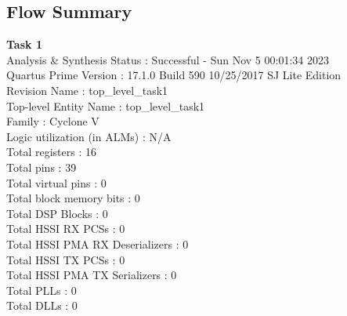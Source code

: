 \documentclass[11pt, titlepage]{article}
\begin{document}
        \subsection{Flow Summary}
            \begin{description}
                \item \textbf{Task 1} \\
                    Analysis \& Synthesis Status : Successful - Sun Nov  5 00:01:34 2023 \\
                    Quartus Prime Version : 17.1.0 Build 590 10/25/2017 SJ Lite Edition \\
                    Revision Name : top\_level\_task1 \\
                    Top-level Entity Name : top\_level\_task1 \\
                    Family : Cyclone V \\
                    Logic utilization (in ALMs) : N/A \\
                    Total registers : 16 \\
                    Total pins : 39 \\
                    Total virtual pins : 0 \\
                    Total block memory bits : 0 \\
                    Total DSP Blocks : 0 \\
                    Total HSSI RX PCSs : 0 \\
                    Total HSSI PMA RX Deserializers : 0 \\
                    Total HSSI TX PCSs : 0 \\
                    Total HSSI PMA TX Serializers : 0 \\
                    Total PLLs : 0 \\
                    Total DLLs : 0 \\


\end{description}
\end{document}

